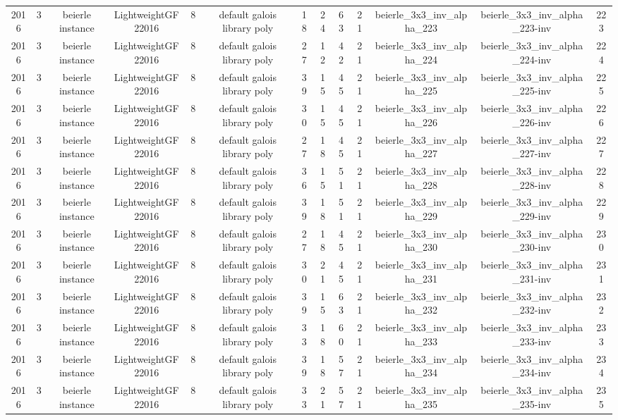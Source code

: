 \begin{tabular}{c c c c c c c c c c c c c}
2016 & 3 & beierle instance & LightweightGF22016 & 8 & default galois library poly & 18 & 24 & 63 & 21 & beierle_3x3_inv_alpha_223 & beierle_3x3_inv_alpha_223-inv & 223 \\
2016 & 3 & beierle instance & LightweightGF22016 & 8 & default galois library poly & 27 & 12 & 42 & 21 & beierle_3x3_inv_alpha_224 & beierle_3x3_inv_alpha_224-inv & 224 \\
2016 & 3 & beierle instance & LightweightGF22016 & 8 & default galois library poly & 39 & 15 & 45 & 21 & beierle_3x3_inv_alpha_225 & beierle_3x3_inv_alpha_225-inv & 225 \\
2016 & 3 & beierle instance & LightweightGF22016 & 8 & default galois library poly & 30 & 15 & 45 & 21 & beierle_3x3_inv_alpha_226 & beierle_3x3_inv_alpha_226-inv & 226 \\
2016 & 3 & beierle instance & LightweightGF22016 & 8 & default galois library poly & 27 & 18 & 45 & 21 & beierle_3x3_inv_alpha_227 & beierle_3x3_inv_alpha_227-inv & 227 \\
2016 & 3 & beierle instance & LightweightGF22016 & 8 & default galois library poly & 36 & 15 & 51 & 21 & beierle_3x3_inv_alpha_228 & beierle_3x3_inv_alpha_228-inv & 228 \\
2016 & 3 & beierle instance & LightweightGF22016 & 8 & default galois library poly & 39 & 18 & 51 & 21 & beierle_3x3_inv_alpha_229 & beierle_3x3_inv_alpha_229-inv & 229 \\
2016 & 3 & beierle instance & LightweightGF22016 & 8 & default galois library poly & 27 & 18 & 45 & 21 & beierle_3x3_inv_alpha_230 & beierle_3x3_inv_alpha_230-inv & 230 \\
2016 & 3 & beierle instance & LightweightGF22016 & 8 & default galois library poly & 30 & 21 & 45 & 21 & beierle_3x3_inv_alpha_231 & beierle_3x3_inv_alpha_231-inv & 231 \\
2016 & 3 & beierle instance & LightweightGF22016 & 8 & default galois library poly & 39 & 15 & 63 & 21 & beierle_3x3_inv_alpha_232 & beierle_3x3_inv_alpha_232-inv & 232 \\
2016 & 3 & beierle instance & LightweightGF22016 & 8 & default galois library poly & 33 & 18 & 60 & 21 & beierle_3x3_inv_alpha_233 & beierle_3x3_inv_alpha_233-inv & 233 \\
2016 & 3 & beierle instance & LightweightGF22016 & 8 & default galois library poly & 39 & 18 & 57 & 21 & beierle_3x3_inv_alpha_234 & beierle_3x3_inv_alpha_234-inv & 234 \\
2016 & 3 & beierle instance & LightweightGF22016 & 8 & default galois library poly & 33 & 21 & 57 & 21 & beierle_3x3_inv_alpha_235 & beierle_3x3_inv_alpha_235-inv & 235 \\

\end{tabular}
